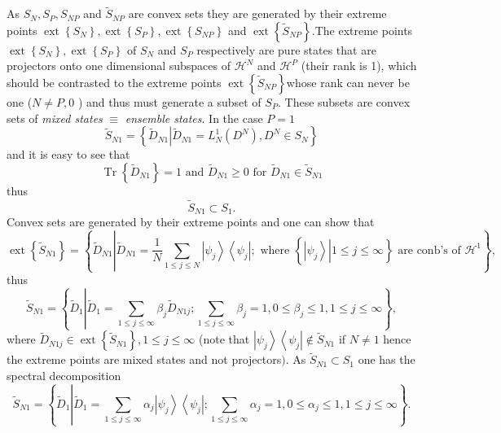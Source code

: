 \documentclass[aps,preprint]{revtex4}%
\begin{document}
As $S_{N},S_{P},S_{NP}$ and $\tilde{S}_{NP}$ are convex sets they are
generated by their extreme points $\operatorname*{ext}\left\{  S_{N}\right\}
,\operatorname*{ext}\left\{  S_{P}\right\}  ,\operatorname*{ext}\left\{
S_{NP}\right\}  $ and $\operatorname*{ext}\left\{  \tilde{S}_{NP}\right\}
.$The extreme points $\operatorname*{ext}\left\{  S_{N}\right\}
,\operatorname*{ext}\left\{  S_{P}\right\}  $ of $S_{N}$ and $S_{P}$
respectively are pure states that are projectors onto one dimensional
subspaces of $\mathcal{H}^{N}$ and $\mathcal{H}^{P}$ (their rank is 1), which
should be contrasted to the extreme points $\operatorname*{ext}\left\{
\tilde{S}_{NP}\right\}  $whose rank can never be one ($N\neq P,0$ ) and thus
must generate a subset of $S_{P}.$ These subsets are convex sets of
\emph{mixed states }$\equiv$ \emph{ensemble states}$.$ In the case $P=1$
\begin{equation}
\tilde{S}_{N1}=\left\{  \left.  \tilde{D}_{N1}\right\vert \tilde{D}_{N1}%
=L_{N}^{1}\left(  D^{N}\right)  ,D^{N}\in S_{N}\right\} \nonumber
\end{equation}
and it is easy to see that
\begin{equation}
\operatorname*{Tr}\left\{  \tilde{D}_{N1}\right\}  =1\text{ and }\tilde
{D}_{N1}\geq0\text{ for }\tilde{D}_{N1}\in\tilde{S}_{N1}%
\end{equation}
thus
\begin{equation}
\tilde{S}_{N1}\subset S_{1}.
\end{equation}
Convex sets are generated by their extreme points \cite{Krein-Millman} and one
can show that
\begin{equation}
\operatorname*{ext}\left\{  \tilde{S}_{N1}\right\}  =\left\{  \tilde{D}%
_{N1}\left\vert \tilde{D}_{N1}=\frac{1}{N}\sum_{1\leq j\leq N}\left\vert
\psi_{j}\right\rangle \left\langle \psi_{j}\right\vert ;\text{ where }\left\{
\left.  \left\vert \psi_{j}\right\rangle \right\vert 1\leq j\leq
\infty\right\}  \text{ are conb's of }\mathcal{H}^{1}\right.  \right\}  ,
\end{equation}
thus%
\begin{equation}
\tilde{S}_{N1}=\left\{  \tilde{D}_{1}\left\vert \tilde{D}_{1}=\sum_{1\leq
j\leq\infty}\beta_{j}\tilde{D}_{N1j};\sum_{1\leq j\leq\infty}\beta_{j}%
=1,0\leq\beta_{j}\leq1,1\leq j\leq\infty\right.  \right\}  ,
\end{equation}
where $\tilde{D}_{N1j}\in\operatorname*{ext}\left\{  \tilde{S}_{N1}\right\}
,1\leq j\leq\infty$ (note that $\left\vert \psi_{j}\right\rangle \left\langle
\psi_{j}\right\vert \notin\tilde{S}_{N1}$ if $N\neq1$ hence the extreme points
are mixed states and not projectors$).$ As $\tilde{S}_{N1}\subset S_{1}$ one
has the spectral decomposition
\begin{equation}
\tilde{S}_{N1}=\left\{  \tilde{D}_{1}\left\vert \tilde{D}_{1}=\sum_{1\leq
j\leq\infty}\alpha_{j}\left\vert \psi_{j}\right\rangle \left\langle \psi
_{j}\right\vert ;\sum_{1\leq j\leq\infty}\alpha_{j}=1,0\leq\alpha_{j}%
\leq1,1\leq j\leq\infty\right.  \right\}  .
\end{equation}
\end{document}
